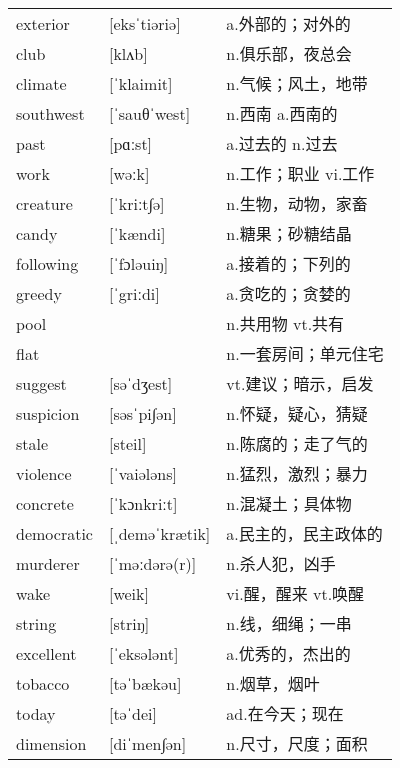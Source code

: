 \documentclass[a4paper]{article}
\begin{document}
\section{}
\begin{tabular}{l l l}

exterior & [eksˈtiəriə] & a.外部的；对外的 \\
club & [klʌb] & n.俱乐部，夜总会 \\
climate & [ˈklaimit] & n.气候；风土，地带 \\
southwest & [ˈsauθˈwest] & n.西南 a.西南的 \\
past & [pɑːst] & a.过去的 n.过去 \\
work & [wəːk] & n.工作；职业 vi.工作 \\
creature & [ˈkriːt∫ə] & n.生物，动物，家畜 \\
candy & [ˈkændi] & n.糖果；砂糖结晶 \\
following & [ˈfɔləuiŋ] & a.接着的；下列的 \\
greedy & [ˈgriːdi] & a.贪吃的；贪婪的 \\
pool &  & n.共用物 vt.共有 \\
flat &  & n.一套房间；单元住宅 \\
suggest & [səˈdʒest] & vt.建议；暗示，启发 \\
suspicion & [səsˈpi∫ən] & n.怀疑，疑心，猜疑 \\
stale & [steil] & n.陈腐的；走了气的 \\
violence & [ˈvaiələns] & n.猛烈，激烈；暴力 \\
concrete & [ˈkɔnkriːt] & n.混凝土；具体物 \\
democratic & [ˌdeməˈkrætik] & a.民主的，民主政体的 \\
murderer & [ˈməːdərə(r)] & n.杀人犯，凶手 \\
wake & [weik] & vi.醒，醒来 vt.唤醒 \\
string & [striŋ] & n.线，细绳；一串 \\
excellent & [ˈeksələnt] & a.优秀的，杰出的 \\
tobacco & [təˈbækəu] & n.烟草，烟叶 \\
today & [təˈdei] & ad.在今天；现在 \\
dimension & [diˈmen∫ən] & n.尺寸，尺度；面积 \\

\end{tabular}
\end{document}
